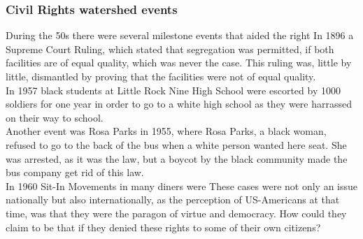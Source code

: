 \documentclass{article}
\begin{document}
	\subsubsection{Civil Rights watershed events}
	During the 50s there were several milestone events that aided the right
	In 1896 a Supreme Court Ruling, which stated that segregation was permitted, if both facilities are of equal quality, which was never the case. This ruling was, little by little, dismantled by proving that the facilities were not of equal quality. \\
	In 1957 black students at Little Rock Nine High School were escorted by 1000 soldiers for one year in order to go to a white high school as they were harrassed on their way to school. \\
	Another event was Rosa Parks in 1955, where Rosa Parks, a black woman, refused to go to the back of the bus when a white person wanted here seat. She was arrested, as it was the law, but a boycot by the black community made the bus company get rid of this law. \\
	In 1960 Sit-In Movements in many diners were
	These cases were not only an issue nationally but also internationally, as the perception of US-Americans at that time, was that they were the paragon of virtue and democracy. How could they claim to be that if they denied these rights to some of their own citizens? \\
\end{document}

